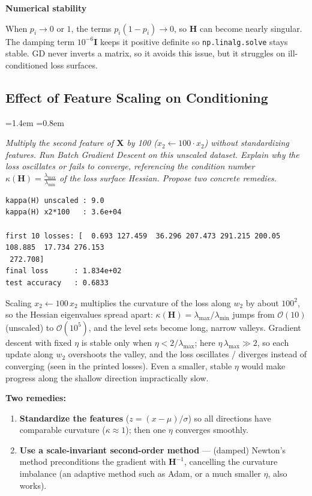 \documentclass[12pt,a4paper]{article}
\newcommand{\qtext}[1]{%
  \begin{list}{}{\leftmargin=1.4em \rightmargin=0.8em
                 \topsep=3pt \parsep=0pt \itemsep=0pt}
  \item[]\itshape #1
  \end{list}}
\begin{document}
\textbf{Numerical stability}

When $p_i \to 0$ or $1$, the terms $p_i(1-p_i) \to 0$, so $\mathbf{H}$ can become nearly singular.
The damping term $10^{-6}\mathbf{I}$ keeps it positive definite so \texttt{np.linalg.solve} stays
stable. GD never inverts a matrix, so it avoids this issue, but it struggles on ill-conditioned
loss surfaces.

\subsection{Effect of Feature Scaling on Conditioning}

\qtext{Multiply the second feature of $\mathbf{X}$ by 100 ($x_2 \leftarrow 100 \cdot x_2$) without
standardizing features. Run Batch Gradient Descent on this unscaled dataset. Explain why the loss
oscillates or fails to converge, referencing the condition number
$\kappa(\mathbf{H}) = \frac{\lambda_{\max}}{\lambda_{\min}}$ of the loss surface Hessian. Propose
two concrete remedies.}



\begin{lstlisting}[style=plainout]
kappa(H) unscaled : 9.0
kappa(H) x2*100   : 3.6e+04

first 10 losses: [  0.693 127.459  36.296 207.473 291.215 200.05  108.885  17.734 276.153
 272.708]
final loss      : 1.834e+02
test accuracy   : 0.6833
\end{lstlisting}

Scaling $x_2 \leftarrow 100\,x_2$ multiplies the curvature of the loss along $w_2$ by about
$100^2$, so the Hessian eigenvalues spread apart:
$\kappa(\mathbf{H}) = \lambda_{\max}/\lambda_{\min}$ jumps from $\mathcal{O}(10)$ (unscaled) to
$\mathcal{O}(10^5)$, and the level sets become long, narrow valleys. Gradient descent with fixed
$\eta$ is stable only when $\eta < 2/\lambda_{\max}$; here $\eta\,\lambda_{\max} \gg 2$, so each
update along $w_2$ overshoots the valley, and the loss oscillates / diverges instead of converging
(seen in the printed losses). Even a smaller, stable $\eta$ would make progress along the shallow
direction impractically slow.

\textbf{Two remedies:}
\begin{enumerate}
\item \textbf{Standardize the features} ($z = (x-\mu)/\sigma$) so all directions have comparable
curvature ($\kappa \approx 1$); then one $\eta$ converges smoothly.
\item \textbf{Use a scale-invariant second-order method} --- (damped) Newton's method
preconditions the gradient with $\mathbf{H}^{-1}$, cancelling the curvature imbalance (an adaptive
method such as Adam, or a much smaller $\eta$, also works).
\end{enumerate}
\end{document}

